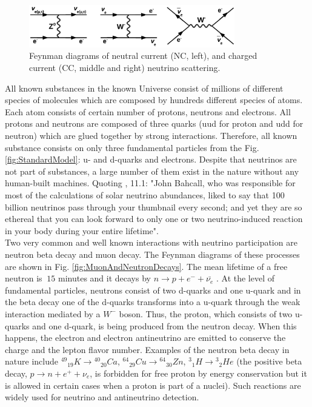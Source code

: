 \begin{figure}
\caption{Feynman diagrams of neutral current (NC, left), and charged current (CC, middle and right) neutrino scattering.}
\label{fig:NuScattering}
\centering
\includegraphics[width=0.80\textwidth, keepaspectratio=true]{figs/neutrinoScattering.png}
\end{figure}


All known substances in the known Universe consist of millions of different species of molecules which are composed by hundreds different species of atoms. Each atom consists of certain number of protons, neutrons and electrons. All protons and neutrons are composed of three quarks (uud for proton and udd for neutron) which are glued together by strong interactions. Therefore, all known substance consists on only three fundamental particles from the Fig. \ref{fig:StandardModel}: u- and d-quarks and electrons. Despite that neutrinos are not part of substances, a large number of them exist in the nature without any human-built machines. Quoting \cite{ref_Griffiths}, 11.1: "John Bahcall, who was responsible for most of the calculations of solar neutrino abundances, liked to say that 100 billion neutrinos pass through your thumbnail every second; and yet they are so ethereal that you can look forward to only one or two neutrino-induced reaction in your body during your entire lifetime".\\

Two very common and well known interactions with neutrino participation are neutron beta decay and muon decay. The Feynman diagrams of these processes are shown in Fig. \ref{fig:MuonAndNeutronDecays}. The mean lifetime of a free neutron is $~15$ minutes and it decays by $n \rightarrow p + e^- + \bar{{\nu}_e} $ \cite{ref_PDG}. At the level of fundamental particles, neutrons consist of two d-quarks and one u-quark and in the beta decay one of the d-quarks transforms into a u-quark through the weak interaction mediated by a $W^- $ boson. Thus, the proton, which consists of two u-quarks and one d-quark, is being produced from the neutron decay. When this happens, the electron and electron antineutrino are emitted to conserve the charge and the lepton flavor number. Examples of the neutron beta decay in nature include ${^{49}}{_{19}}K \rightarrow {^{40}}{_{20}}Ca$, ${^{64}}{_{29}}Cu \rightarrow {^{64}}{_{30}}Zn$, ${^3}{_1}H \rightarrow {^3}{_2}He$ \cite{ref_Griffiths} (the positive beta decay,  $p \rightarrow n + e^+ + {\nu}_e $, is forbidden for free proton by energy conservation but it is allowed in certain cases when a proton is part of a nuclei). Such reactions are widely used for neutrino and antineutrino detection.\\

